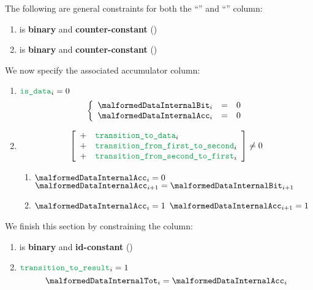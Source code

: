 The following are general constraints for both the ``'' and ``'' column:
\begin{enumerate}
    \item \malformedDataInternalBit{} is \textbf{binary} and \textbf{counter-constant} \quad (\trash)
    \item \malformedDataInternalAcc{} is \textbf{binary} and \textbf{counter-constant} \quad (\trash)
\end{enumerate}
We now specify the associated accumulator column:
\begin{enumerate}[resume]
    \item \If $\locIsData _{i} = 0$ \Then
        \[
            \left\{ \begin{array}{lclr}
                \malformedDataInternalBit _{i} & = & 0 \\
                \malformedDataInternalAcc _{i} & = & 0 \\
            \end{array} \right.
        \]
    \item \If
        \[
            \left[ \begin{array}{cl}
                + & \locTransitionToData            _{i} \\
                + & \locTransitionFromFirstToSecond _{i} \\
                + & \locTransitionFromSecondToFirst _{i} \\
            \end{array} \right]
            \neq 0
        \]
        \Then
        \begin{enumerate}
            \item \If $\malformedDataInternalAcc _{i} = 0$ \Then $\malformedDataInternalAcc _{i+1} = \malformedDataInternalBit_ {i+1}$
            \item \If $\malformedDataInternalAcc _{i} = 1$ \Then $\malformedDataInternalAcc _{i+1} = 1$
        \end{enumerate}
\end{enumerate}
We finish this section by constraining the \malformedDataInternalTot{} column:
\begin{enumerate}[resume]
    \item \malformedDataInternalTot{} is \textbf{binary} and \textbf{id-constant} \quad (\trash)
    \item \If $\locTransitionToResult _{i} = 1$ \Then
        \[
            \malformedDataInternalTot _{i} = \malformedDataInternalAcc _{i}
        \]
\end{enumerate}